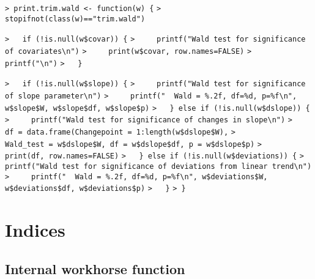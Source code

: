 \documentclass[a4paper]{article}
\begin{document}
\verb~> print.trim.wald <- function(w) {~\newline
\verb~>   stopifnot(class(w)=="trim.wald")~\par

\verb~>   if (!is.null(w$covar)) {~\newline
\verb~>     printf("Wald test for significance of covariates\n")~\newline
\verb~>     print(w$covar, row.names=FALSE)~\newline
\verb~>     printf("\n")~\newline
\verb~>   }~\par

\verb~>   if (!is.null(w$slope)) {~\newline
\verb~>     printf("Wald test for significance of slope parameter\n")~\newline
\verb~>     printf("  Wald = %.2f, df=%d, p=%f\n", w$slope$W, w$slope$df, w$slope$p)~\newline
\verb~>   } else if (!is.null(w$dslope)) {~\newline
\verb~>     printf("Wald test for significance of changes in slope\n")~\newline
\verb~>     df = data.frame(Changepoint = 1:length(w$dslope$W),~\newline
\verb~>                     Wald_test = w$dslope$W, df = w$dslope$df, p = w$dslope$p)~\newline
\verb~>     print(df, row.names=FALSE)~\newline
\verb~>   } else if (!is.null(w$deviations)) {~\newline
\verb~>     printf("Wald test for significance of deviations from linear trend\n")~\newline
\verb~>     printf("  Wald = %.2f, df=%d, p=%f\n", w$deviations$W, w$deviations$df, w$deviations$p)~\newline
\verb~>   }~\newline
\verb~> }~\par


\section{Indices}\par




\subsection{Internal workhorse function}\par
\end{document}
